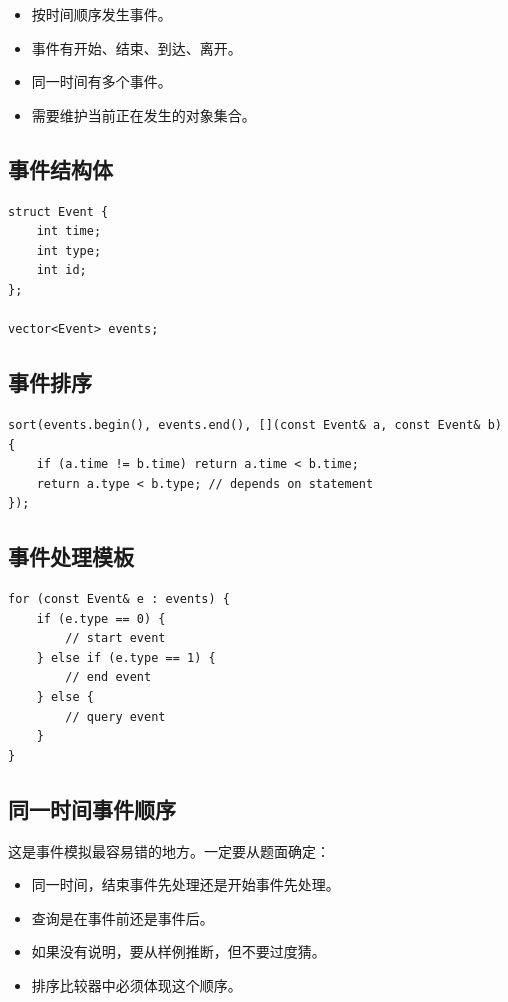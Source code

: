 \begin{itemize}
  \item 按时间顺序发生事件。
  \item 事件有开始、结束、到达、离开。
  \item 同一时间有多个事件。
  \item 需要维护当前正在发生的对象集合。
\end{itemize}

\subsection{事件结构体}

\begin{lstlisting}
struct Event {
    int time;
    int type;
    int id;
};

vector<Event> events;
\end{lstlisting}

\subsection{事件排序}

\begin{lstlisting}
sort(events.begin(), events.end(), [](const Event& a, const Event& b) {
    if (a.time != b.time) return a.time < b.time;
    return a.type < b.type; // depends on statement
});
\end{lstlisting}

\subsection{事件处理模板}

\begin{lstlisting}
for (const Event& e : events) {
    if (e.type == 0) {
        // start event
    } else if (e.type == 1) {
        // end event
    } else {
        // query event
    }
}
\end{lstlisting}

\subsection{同一时间事件顺序}

这是事件模拟最容易错的地方。一定要从题面确定：

\begin{itemize}
  \item 同一时间，结束事件先处理还是开始事件先处理。
  \item 查询是在事件前还是事件后。
  \item 如果没有说明，要从样例推断，但不要过度猜。
  \item 排序比较器中必须体现这个顺序。
\end{itemize}

